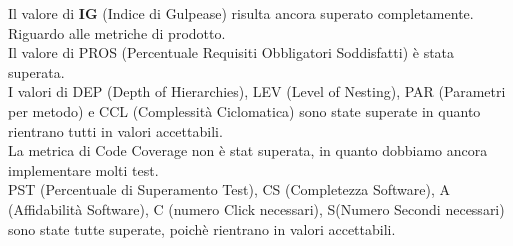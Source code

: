 Il valore di \textbf{IG} (Indice di Gulpease) risulta ancora superato completamente.\\
Riguardo alle metriche di prodotto.\\
Il valore di PROS (Percentuale Requisiti Obbligatori Soddisfatti) è stata superata.\\I valori di DEP (Depth of Hierarchies), LEV (Level of Nesting), PAR (Parametri per metodo) e CCL (Complessità Ciclomatica) sono state superate in quanto rientrano tutti in valori accettabili.\\La metrica di Code Coverage non è stat superata, in quanto dobbiamo ancora implementare molti test.\\PST (Percentuale di Superamento Test), CS (Completezza Software), A (Affidabilità Software), C (numero Click necessari), S(Numero Secondi necessari) sono state tutte superate, poichè rientrano in valori accettabili.
